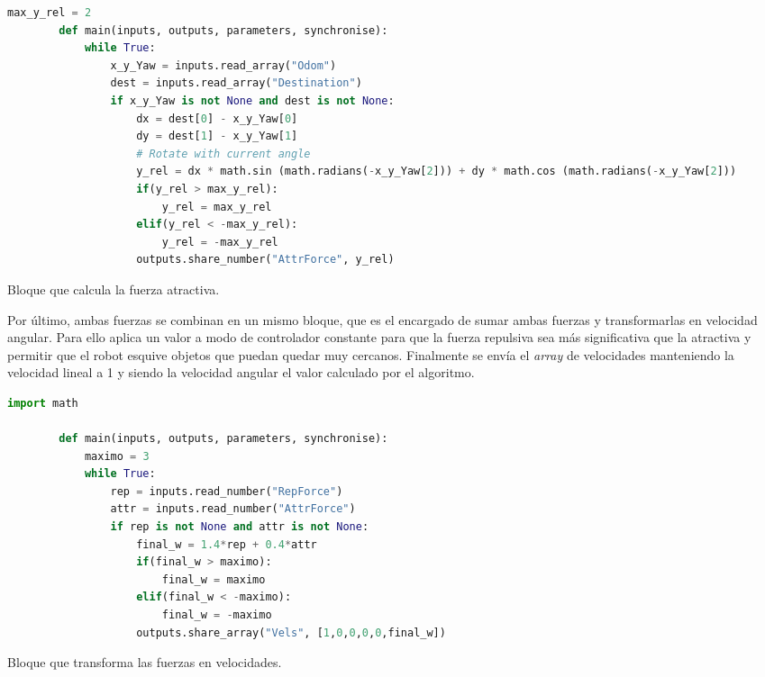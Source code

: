 \begin{code}[H]
    \begin{lstlisting}[language=python]
        max_y_rel = 2
        def main(inputs, outputs, parameters, synchronise):
            while True:
                x_y_Yaw = inputs.read_array("Odom")
                dest = inputs.read_array("Destination")
                if x_y_Yaw is not None and dest is not None:
                    dx = dest[0] - x_y_Yaw[0]
                    dy = dest[1] - x_y_Yaw[1]
                    # Rotate with current angle
                    y_rel = dx * math.sin (math.radians(-x_y_Yaw[2])) + dy * math.cos (math.radians(-x_y_Yaw[2]))
                    if(y_rel > max_y_rel):
                        y_rel = max_y_rel
                    elif(y_rel < -max_y_rel):
                        y_rel = -max_y_rel
                    outputs.share_number("AttrForce", y_rel)
    \end{lstlisting}
    \caption[Bloque fuerza atractiva]{Bloque que calcula la fuerza atractiva.}
    \label{cod:attr_vel}
\end{code}

Por último, ambas fuerzas se combinan en un mismo bloque, que es el encargado de sumar ambas fuerzas y transformarlas en velocidad angular. Para ello aplica
un valor a modo de controlador constante para que la fuerza repulsiva sea más significativa que la atractiva y permitir que el robot esquive objetos que
puedan quedar muy cercanos. Finalmente se envía el \textit{array} de velocidades manteniendo la velocidad lineal a 1 y siendo la velocidad angular el valor
calculado por el algoritmo.

\begin{code}[H]
    \begin{lstlisting}[language=python]
        import math

        def main(inputs, outputs, parameters, synchronise):
            maximo = 3
            while True:            
                rep = inputs.read_number("RepForce")
                attr = inputs.read_number("AttrForce")
                if rep is not None and attr is not None:
                    final_w = 1.4*rep + 0.4*attr
                    if(final_w > maximo):
                        final_w = maximo
                    elif(final_w < -maximo):
                        final_w = -maximo
                    outputs.share_array("Vels", [1,0,0,0,0,final_w])
    \end{lstlisting}
    \caption[Bloque fuerzas a velocidades]{Bloque que transforma las fuerzas en velocidades.}
    \label{cod:VFF_force_to_vel}
\end{code}

